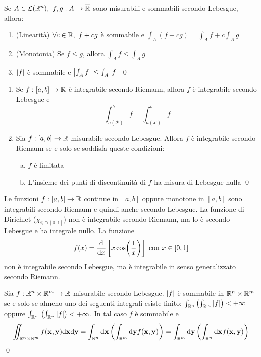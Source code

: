 \begin{theorem}
	Se $A \in \mathcal{L}(\mathbb{R}^n), \ f,g:A \to \overline{\mathbb{R}}$ sono misurabili e sommabili secondo Lebesgue, allora:
	\begin{enumerate}
		\item (Linearità) $\forall c \in \R, \ f+cg$ è sommabile e $\int_A(f+cg)=\int_Af+c\int_Ag$
		\item (Monotonia) Se $f\leq g$, allora $\int_Af\leq\int_Ag$
		\item $\abs{f}$ è sommabile e $\abs{\int_Af}\leq\int_A\abs{f}$
		\qed
	\end{enumerate}
\end{theorem}

\begin{theorem}\leavevmode
	\begin{enumerate}
		\item Se $f:[a,b]\to\mathbb{R}$ è integrabile secondo Riemann, allora $f$ è integrabile secondo Lebesgue e $$\int_{a(\mathcal{R})}^bf=\int_{a(\mathcal{L})}^{b}f$$
		\item Sia $f:[a,b]\to\mathbb{R}$ misurabile secondo Lebesgue. Allora $f$ è integrabile secondo Riemann se e solo se soddisfa queste condizioni:
		\begin{enumerate}[a.]
			\item $f$ è limitata
			\item L'insieme dei punti di discontinuità di $f$ ha misura di Lebesgue nulla
			\qed
		\end{enumerate}
	\end{enumerate}
\end{theorem}

Le funzioni $f:[a,b]\to\mathbb{R}$ continue in $[a,b]$ oppure monotone in $[a,b]$ sono integrabili secondo Riemann e quindi anche secondo Lebesgue. La funzione di Dirichlet ($\chi_{\mathbb{Q}\cap[0,1]}$) non è integrabile secondo Riemann, ma lo è secondo Lebesgue e ha integrale nullo. La funzione
$$
	f(x)=\frac{\dd}{\dd x}\left[x\cos(\frac{1}{x})\right] \text{ con } x \in [0,1]
$$
non è integrabile secondo Lebesgue, ma è integrabile in senso generalizzato secondo Riemann.

\begin{theorem}
	[di Fubini]
	Sia $f:\mathbb{R}^n\times\mathbb{R}^m\to\mathbb{R}$ misurabile secondo Lebesgue. $\abs{f}$ è sommabile in $\mathbb{R}^n\times\mathbb{R}^m$ se e solo se almeno uno dei seguenti integrali esiste finito: $\int_{\mathbb{R}^n}\left(\int_{\mathbb{R}^m}\abs{f}\right)<+\infty$ oppure $\int_{\mathbb{R}^m}\left(\int_{\mathbb{R}^n}\abs{f}\right)<+\infty$. In tal caso $f$ è sommabile e 
	$$
		\iint_{\mathbb{R}^n\times\mathbb{R}^m}f(\vb{x},\vb{y})\dd \vb{x} \dd \vb{y} = \int_{\mathbb{R}^n}\dd \vb{x}\left(\int_{\mathbb{R}^m} \dd \vb{y} f(\vb{x},\vb{y})\right)=\int_{\mathbb{R}^m}\dd \vb{y} \left(\int_{\mathbb{R}^n}\dd \vb{x} f(\vb{x},\vb{y})\right)
	$$
	\qed
\end{theorem}

